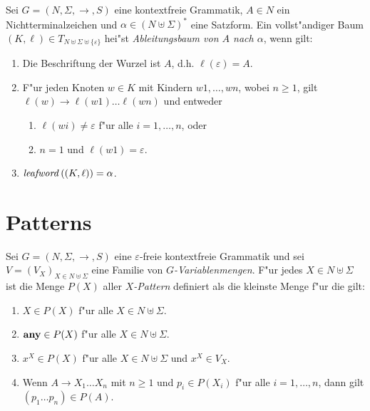 \documentclass[12pt,a4paper]{article}
\begin{document}
\begin{definition}[Ableitungsbaum]
  Sei $G=(N,\Sigma,\to,S)$ eine kontextfreie Grammatik, $A \in N$ ein Nichtterminalzeichen und
  $\alpha \in (N \uplus \Sigma)^*$ eine Satzform. Ein vollst"andiger Baum
  $(K,\ell) \in T_{N \uplus \Sigma \uplus \{\varepsilon\}}$ hei"st
  \emph{Ableitungsbaum von $A$ nach $\alpha$}, wenn gilt:
  \begin{enumerate}
  \item Die Beschriftung der Wurzel ist $A$, d.h. $\ell(\varepsilon)=A$.
  \item F"ur jeden Knoten $w \in K$ mit Kindern $w1,\ldots,wn$, wobei $n \ge 1$, gilt
    $\ell(w) \to \ell(w1)\ldots\ell(wn)$ und entweder
    \begin{enumerate}
    \item $\ell(wi)\ne\varepsilon$ f"ur alle $i=1,\ldots,n$, oder
    \item $n = 1$ und $\ell(w1)=\varepsilon$.
    \end{enumerate}
  \item $\mathit{leafword}\,((K,\ell)) = \alpha$.
  \end{enumerate}
\end{definition}


\section{Patterns}

\begin{definition}[Patterns]
  Sei $G = (N,\Sigma,\to,S)$ eine $\varepsilon$-freie kontextfreie Grammatik und sei
  $V = (V_X)_{X\in N \uplus \Sigma}$ eine Familie von \emph{$G$-Variablenmengen}. F"ur
  jedes $X \in N \uplus \Sigma$ ist die Menge $P(X)$ aller \emph{$X$-Pattern}
  definiert als die kleinste Menge f"ur die gilt:
  \begin{enumerate}
  \item $X \in P(X)$ f"ur alle $X \in N \uplus \Sigma$.
  \item $\mathbf{any} \in P(X)$ f"ur alle $X \in N \uplus \Sigma$.
  \item $x^X \in P(X)$ f"ur alle $X \in N \uplus \Sigma$ und $x^X \in V_X$.
  \item Wenn $A \to X_1 \ldots X_n$ mit $n \ge 1$ und $p_i \in P(X_i)$ f"ur alle $i=1,\ldots,n$,
    dann gilt $(p_1 \ldots p_n) \in P(A)$.
  \end{enumerate}
\end{definition}
\end{document}
